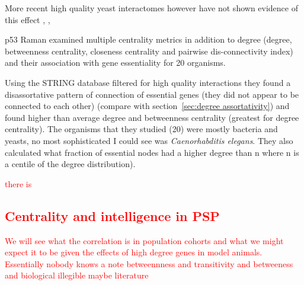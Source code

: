 More recent high quality yeast interactomes however have not shown evidence of this effect \cite{milenkovic2011dominating}, \cite{yu2008high}, 

p53 
Raman \cite{raman2014organisational} examined multiple centrality metrics in addition to degree (degree, betweenness centrality, closeness centrality and pairwise dis-connectivity index) and their association with gene essentiality for 20 organisms.

 Using the STRING database filtered for high quality interactions they found a disassortative  pattern of connection of essential genes (they did not appear to be connected to each other)  (compare with section~\ref{sec:degree assortativity})  and found higher than average degree and betweenness centrality (greatest for degree centrality). The organisms that they studied (20) were mostly bacteria and yeasts, no most sophisticated I could see was \textit{Caenorhabditis elegans}. They also calculated what fraction of essential nodes had a higher degree than n where n is a centile of the degree distribution).


\textcolor{red}{there is\subsection{Centrality and intelligence in PSP}
We will see what the correlation is in population cohorts and what we might expect it to be given the effects of high degree genes in model animals. Essentially nobody knows 
 a note betweennness and transitivity and betweeness and biological illegible maybe literature}
 






